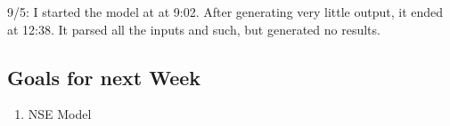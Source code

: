 \documentclass[11pt]{article} %
\begin{document}
9/5: I started the model at at 9:02. After generating very little output, it ended at 12:38. It parsed all the inputs and such, but generated no results.


\subsection{Goals for next Week}
\begin{enumerate}
\item NSE Model
\end{enumerate}
\end{document}
